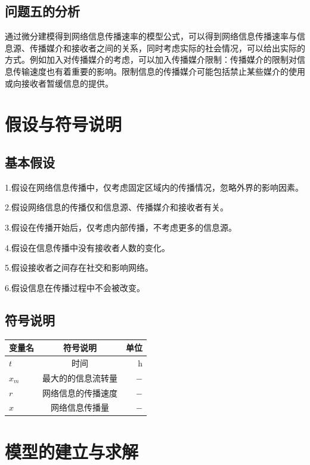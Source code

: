 \documentclass[UTF8]{ctexart}
\begin{document}
\subsection{问题五的分析}
通过微分建模得到网络信息传播速率的模型公式，可以得到网络信息传播速率与信息源、传播媒介和接收者之间的关系，同时考虑实际的社会情况，可以给出实际的方式。例如加入对传播媒介的考虑，可以加入传播媒介限制：传播媒介的限制对信息传输速度也有着重要的影响。限制信息的传播媒介可能包括禁止某些媒介的使用或向接收者暂缓信息的提供。\par
\section{假设与符号说明}
\subsection{基本假设}
1.假设在网络信息传播中，仅考虑固定区域内的传播情况，忽略外界的影响因素。\par 
2.假设网络信息的传播仅和信息源、传播媒介和接收者有关。\par 
3.假设在传播开始后，仅考虑内部传播，不考虑更多的信息源。\par 
4.假设在信息传播中没有接收者人数的变化。\par 
5.假设接收者之间存在社交和影响网络。\par 
6.假设信息在传播过程中不会被改变。\par 
\subsection{符号说明}
\begin{table}[htbp]
	\centering 
	\begin{tabular}{lcr}
		\toprule
		变量名 & 符号说明 & 单位 \\
		\midrule
		$t$ & 时间& h \\
		${x_m}$ & 最大的的信息流转量 & $-$ \\
		$r$ & 网络信息的传播速度 & $-$ \\
		$x$ & 网络信息传播量 & $-$ \\
		\bottomrule
	\end{tabular}
\end{table}
\section{模型的建立与求解}
\end{document}
